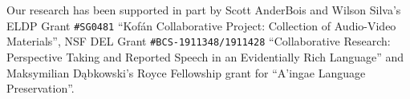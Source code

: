 \documentclass[output=paper,colorlinks,citecolor=brown]{langscibook}
\begin{document}
Our research has been supported in part by Scott AnderBois and Wilson Silva's ELDP Grant \texttt{\#SG0481} ``Kofán Collaborative Project: Collection of Audio-Video Materials'', NSF DEL Grant \texttt{\#BCS-1911348/1911428} ``Collaborative Research: Perspective Taking and Reported Speech in an Evidentially Rich Language'' and Maksymilian Dąbkowski's Royce Fellowship grant for ``A'ingae Language Preservation''.






\sloppy
\printbibliography[heading=subbibliography, notkeyword=this]
\end{document}
